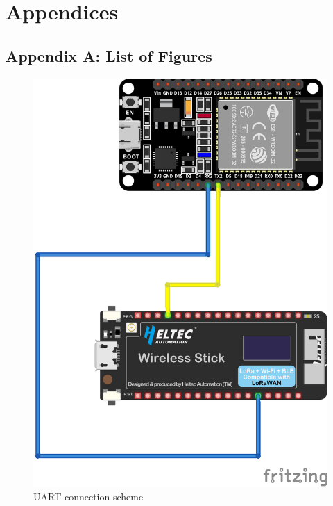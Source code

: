 
\section{Appendices}
\label{chap:appendix}

\subsection{Appendix A: List of Figures}
\label{sec:appendixA}

\begin{figure}[h!]
  \centering
  \includegraphics[width=0.8\linewidth]{figures/uart_connection.png}
  \caption{UART connection scheme}
  \label{fig:uart_connection}
\end{figure}

